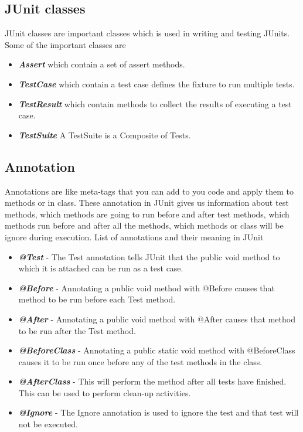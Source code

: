 \documentclass[11pt,a4paper]{article}
\begin{document}
\subsection*{JUnit classes}
JUnit classes are important classes which is used in writing and testing JUnits. Some of the important classes are

\begin{itemize}
\item \emph{\textbf{Assert}} which contain a set of assert methods.
\item \emph{\textbf{TestCase}} which contain a test case defines the fixture to run multiple tests.
\item \emph{\textbf{TestResult}} which contain methods to collect the results of executing a test case.
\item \emph{\textbf{TestSuite}} A TestSuite is a Composite of Tests.
\end{itemize}

\subsection*{Annotation}
Annotations are like meta-tags that you can add to you code and apply them to methods or in class. These annotation in JUnit gives us information about test methods, which methods are going to run before and after test methods, which methods run before and after all the methods, which methods or class will be ignore during execution. List of annotations and their meaning in JUnit

\begin{itemize}
\item \emph{\textbf{@Test}} - The Test annotation tells JUnit that the public void method to which it is attached can be run as a test case.
\item \emph{\textbf{@Before}} - Annotating a public void method with @Before causes that method to be run before each Test method.
\item \emph{\textbf{@After}} - Annotating a public void method with @After causes that method to be run after the Test method.
\item \emph{\textbf{@BeforeClass}} - Annotating a public static void method with @BeforeClass causes it to be run once before any of the test methods in the class.
\item \emph{\textbf{@AfterClass}} - This will perform the method after all tests have finished. This can be used to perform clean-up activities.
\item \emph{\textbf{@Ignore}} - The Ignore annotation is used to ignore the test and that test will not be executed.
\end{itemize}
\end{document}
